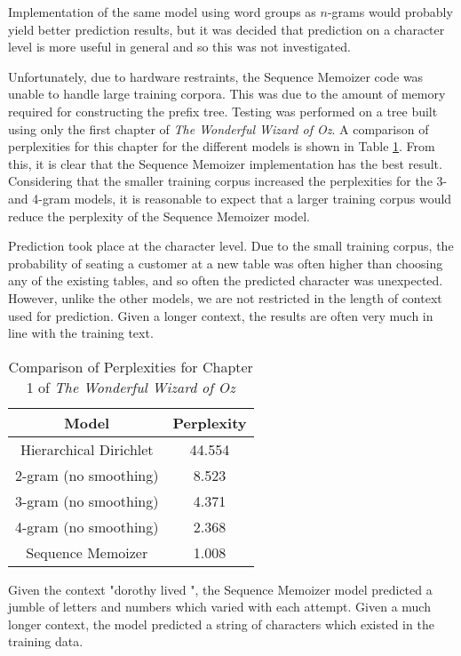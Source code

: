 Implementation of the same model using word groups as $n$-grams would probably yield better prediction results, but it was decided that prediction on a character level is more useful in general and so this was not investigated.

Unfortunately, due to hardware restraints, the Sequence Memoizer code was unable to handle large training corpora. This was due to the amount of memory required for constructing the prefix tree. Testing was performed on a tree built using only the first chapter of \textit{The Wonderful Wizard of Oz}. A comparison of perplexities for this chapter for the different models is shown in Table \ref{table:chapterOnePerplexities}. From this, it is clear that the Sequence Memoizer implementation has the best result. Considering that the smaller training corpus increased the perplexities for the 3- and 4-gram models, it is reasonable to expect that a larger training corpus would reduce the perplexity of the Sequence Memoizer model.

Prediction took place at the character level. Due to the small training corpus, the probability of seating a customer at a new table was often higher than choosing any of the existing tables, and so often the predicted character was unexpected. However, unlike the other models, we are not restricted in the length of context used for prediction. Given a longer context, the results are often very much in line with the training text. 

\begin{table}
\caption{Comparison of Perplexities for Chapter 1 of \textit{The Wonderful Wizard of Oz}}
\label{table:chapterOnePerplexities}
\begin{center}
\begin{tabular}{|c|c|}
\hline
\textbf{Model} & \textbf{Perplexity} \\ \hline
Hierarchical Dirichlet & 44.554 \\ \hline
2-gram (no smoothing) & 8.523 \\ \hline
3-gram (no smoothing) & 4.371 \\ \hline
4-gram (no smoothing) & 2.368 \\ \hline

Sequence Memoizer & 1.008 \\ \hline
\end{tabular} 
\end{center} 
\end{table}

Given the context "dorothy lived ", the Sequence Memoizer model predicted a jumble of letters and numbers which varied with each attempt. Given a much longer context, the model predicted a string of characters which existed in the training data. 

